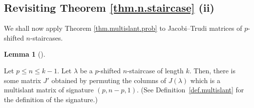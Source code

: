 \documentclass[numbers=enddot,12pt,final,onecolumn,notitlepage]{scrartcl}%
\theoremstyle{definition}
\newtheorem{lem}[theo]{Lemma}
\newenvironment{lemma}[1][]
{\begin{lem}[#1]\begin{leftbar}}
{\end{leftbar}\end{lem}}
\renewcommand{\leq}{\leqslant}
\theoremstyle{plainsl}
\begin{document}
\subsection{Revisiting Theorem \ref{thm.n.staircase} (ii)}

We shall now apply Theorem \ref{thm.multislant.prob} to Jacobi--Trudi matrices of $p$-shifted $n$-staircases.

\begin{lemma}
\label{multistair}
Let $p \leq n \leq k-1$.
Let $\lambda$ be a $p$-shifted $n$-staircase of length $k$.
Then, there is some matrix $J'$ obtained by permuting the columns of $J(\lambda)$ which is a multislant matrix
of signature $(p, n-p, 1)$.
(See Definition~\ref{def.multislant} for the definition of the signature.)
\end{lemma}

\end{document}
